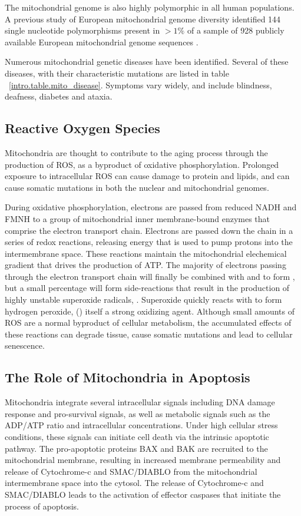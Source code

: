 The mitochondrial genome is also highly polymorphic in all human populations.  A previous study of European mitochondrial genome diversity identified 144 single nucleotide polymorphisms present in $>1\%$ of a sample of 928 publicly available European mitochondrial genome sequences \cite{saxena2006comprehensive}.

Numerous mitochondrial genetic diseases have been identified\cite{chinnery1999mitochondrial,schapira2012mitochondrial}. Several of these diseases, with their characteristic mutations are listed in table ~\ref{intro.table.mito_disease}. Symptoms vary widely, and include blindness, deafness, diabetes and ataxia.

\subsection{Reactive Oxygen Species}
Mitochondria are thought to contribute to the aging process through the production of \ac{ROS}, as a byproduct of oxidative phosphorylation\cite{Wallace1999, Moreno-Loshuertos2006}. Prolonged exposure to intracellular \ac{ROS} can cause damage to protein and lipids, and can cause somatic mutations in both the nuclear and mitochondrial genomes.

During oxidative phosphorylation, electrons are passed from reduced \ac{NADH} and \ac{FMNH} to a group of mitochondrial inner membrane-bound enzymes that comprise the electron transport chain.  Electrons are passed down the chain in a series of redox reactions, releasing energy that is used to pump protons into the intermembrane space.  These reactions maintain the mitochondrial elechemical gradient that drives the production of ATP.  The majority of electrons passing through the electron transport chain will finally be combined with  and  to form , but a small percentage will form side-reactions that result in the production of highly unstable superoxide radicals, .  Superoxide quickly reacts with  to form hydrogen peroxide, () itself a strong oxidizing agent.  Although small amounts of ROS are a normal byproduct of cellular metabolism, the accumulated effects of these reactions can degrade tissue, cause somatic mutations and lead to cellular senescence\cite{Toyokuni1999, Passos2007}.

\subsection{The Role of Mitochondria in Apoptosis}
Mitochondria integrate several intracellular signals including DNA damage response and pro-survival signals, as well as metabolic signals such as the ADP/ATP ratio and intracellular  concentrations.  Under high cellular stress conditions, these signals can initiate cell death via the intrinsic apoptotic pathway.  The pro-apoptotic proteins BAX and BAK are recruited to the mitochondrial membrane, resulting in increased membrane permeability and release of Cytochrome-c and SMAC/DIABLO from the mitochondrial intermembrane space into the cytosol.  The release of Cytochrome-c and SMAC/DIABLO leads to the activation of effector caspases that initiate the process of apoptosis.


